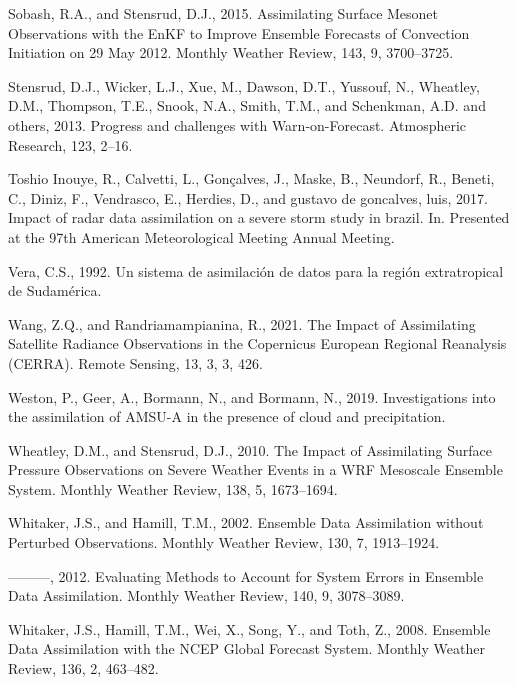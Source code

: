 \documentclass[12pt,twoside]{reedthesis}
\begin{document}
\leavevmode\hypertarget{ref-sobash2015}{}%
Sobash, R.A., and Stensrud, D.J., 2015. Assimilating Surface Mesonet Observations with the EnKF to Improve Ensemble Forecasts of Convection Initiation on 29 May 2012. Monthly Weather Review, 143, 9, 3700--3725.

\leavevmode\hypertarget{ref-stensrud2013}{}%
Stensrud, D.J., Wicker, L.J., Xue, M., Dawson, D.T., Yussouf, N., Wheatley, D.M., Thompson, T.E., Snook, N.A., Smith, T.M., and Schenkman, A.D. and others, 2013. Progress and challenges with Warn-on-Forecast. Atmospheric Research, 123, 2--16.

\leavevmode\hypertarget{ref-toshioinouye2017}{}%
Toshio Inouye, R., Calvetti, L., Gonçalves, J., Maske, B., Neundorf, R., Beneti, C., Diniz, F., Vendrasco, E., Herdies, D., and gustavo de goncalves, luis, 2017. Impact of radar data assimilation on a severe storm study in brazil. In. Presented at the 97th American Meteorological Meeting Annual Meeting.

\leavevmode\hypertarget{ref-vera1992}{}%
Vera, C.S., 1992. Un sistema de asimilación de datos para la región extratropical de Sudamérica.

\leavevmode\hypertarget{ref-wang2021}{}%
Wang, Z.Q., and Randriamampianina, R., 2021. The Impact of Assimilating Satellite Radiance Observations in the Copernicus European Regional Reanalysis (CERRA). Remote Sensing, 13, 3, 3, 426.

\leavevmode\hypertarget{ref-weston2019}{}%
Weston, P., Geer, A., Bormann, N., and Bormann, N., 2019. Investigations into the assimilation of AMSU-A in the presence of cloud and precipitation.

\leavevmode\hypertarget{ref-wheatley2010}{}%
Wheatley, D.M., and Stensrud, D.J., 2010. The Impact of Assimilating Surface Pressure Observations on Severe Weather Events in a WRF Mesoscale Ensemble System. Monthly Weather Review, 138, 5, 1673--1694.

\leavevmode\hypertarget{ref-whitaker2002}{}%
Whitaker, J.S., and Hamill, T.M., 2002. Ensemble Data Assimilation without Perturbed Observations. Monthly Weather Review, 130, 7, 1913--1924.

\leavevmode\hypertarget{ref-whitaker2012}{}%
---------, 2012. Evaluating Methods to Account for System Errors in Ensemble Data Assimilation. Monthly Weather Review, 140, 9, 3078--3089.

\leavevmode\hypertarget{ref-whitaker2008}{}%
Whitaker, J.S., Hamill, T.M., Wei, X., Song, Y., and Toth, Z., 2008. Ensemble Data Assimilation with the NCEP Global Forecast System. Monthly Weather Review, 136, 2, 463--482.
\end{document}
